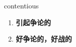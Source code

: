 
\begin{frame}
{\huge contentious}
\begin{center}
\begin{enumerate}\Large
  \item \textbf{引起争论的}
  \item \textbf{好争论的，好战的}
\end{enumerate}
\end{center}
\end{frame}
